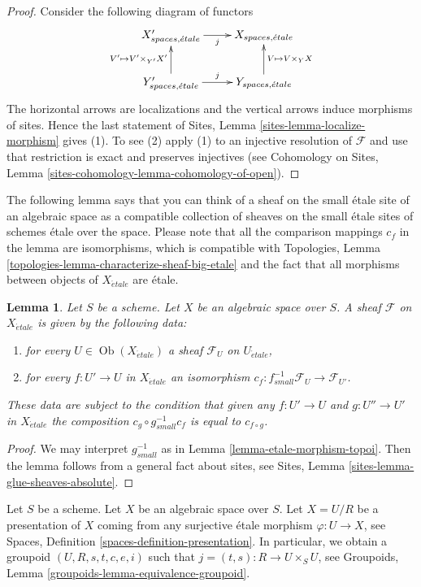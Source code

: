\documentclass{stacks-project}
\theoremstyle{plain}
\newtheorem{lemma}[subsection]{Lemma}
\theoremstyle{definition}
\theoremstyle{remark}
\numberwithin{equation}{subsection}
\def\Ob{\mathop{\mathrm{Ob}}\nolimits}
\def\etale{{\acute{e}tale}}
\begin{document}
\begin{proof}
Consider the following diagram of functors
$$
\xymatrix{
X'_{spaces, \etale} \ar[r]_j &
X_{spaces, \etale} \\
Y'_{spaces, \etale} \ar[r]^j \ar[u]^{V' \mapsto V' \times_{Y'} X'} &
Y_{spaces, \etale} \ar[u]_{V \mapsto V \times_Y X}
}
$$
The horizontal arrows are localizations and the vertical arrows induce
morphisms of sites. Hence the last statement of
Sites, Lemma \ref{sites-lemma-localize-morphism}
gives (1). To see (2) apply (1) to an injective resolution of $\mathcal{F}$
and use that restriction is exact and preserves injectives (see
Cohomology on Sites, Lemma \ref{sites-cohomology-lemma-cohomology-of-open}).
\end{proof}

\noindent
The following lemma says that you can think of a sheaf on the small
\'etale site of an algebraic space as a compatible collection of sheaves
on the small \'etale sites of schemes \'etale over the space. Please note
that all the comparison mappings $c_f$ in the lemma are isomorphisms,
which is compatible with
Topologies, Lemma \ref{topologies-lemma-characterize-sheaf-big-etale}
and the fact that all morphisms between objects of $X_\etale$
are \'etale.

\begin{lemma}
\label{lemma-characterize-sheaf-small-etale}
Let $S$ be a scheme. Let $X$ be an algebraic space over $S$.
A sheaf $\mathcal{F}$ on $X_\etale$ is given by the following data:
\begin{enumerate}
\item for every $U \in \Ob(X_\etale)$ a sheaf
$\mathcal{F}_U$ on $U_\etale$,
\item for every $f : U' \to U$ in $X_\etale$ an isomorphism
$c_f : f_{small}^{-1}\mathcal{F}_U \to \mathcal{F}_{U'}$.
\end{enumerate}
These data are subject to the condition that given any $f : U' \to U$
and $g : U'' \to U'$ in $X_\etale$ the composition
$c_g \circ g_{small}^{-1} c_f$ is equal to $c_{f \circ g}$.
\end{lemma}

\begin{proof}
We may interpret $g_{small}^{-1}$ as in Lemma \ref{lemma-etale-morphism-topoi}.
Then the lemma follows from a general fact about sites, see
Sites, Lemma \ref{sites-lemma-glue-sheaves-absolute}.
\end{proof}

\noindent
Let $S$ be a scheme. Let $X$ be an algebraic space over $S$.
Let $X = U/R$ be a presentation of $X$ coming from any surjective
\'etale morphism $\varphi : U \to X$, see
Spaces, Definition \ref{spaces-definition-presentation}.
In particular, we obtain a groupoid $(U, R, s, t, c, e, i)$ such that
$j = (t, s) : R \to U \times_S U$, see
Groupoids, Lemma \ref{groupoids-lemma-equivalence-groupoid}.
\end{document}
